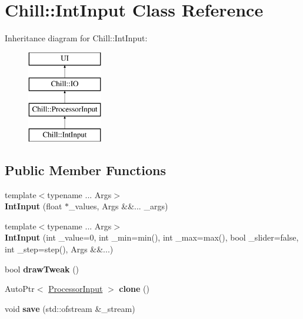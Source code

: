\hypertarget{class_chill_1_1_int_input}{}\section{Chill\+:\+:Int\+Input Class Reference}
\label{class_chill_1_1_int_input}
Inheritance diagram for Chill\+:\+:Int\+Input\+:\begin{figure}[H]
\begin{center}
\leavevmode
\includegraphics[height=4.000000cm]{class_chill_1_1_int_input}
\end{center}
\end{figure}
\subsection*{Public Member Functions}
\begin{DoxyCompactItemize}
\item 
\mbox{\label{class_chill_1_1_int_input_a1103252b1a63f9f4b0b44e92846384aa}} 
{\footnotesize template$<$typename ... Args$>$ }\\{\bfseries Int\+Input} (float $\ast$\+\_\+values, Args \&\&... \+\_\+args)
\item 
\mbox{\label{class_chill_1_1_int_input_a773428cabf7d5948bd328d1f5da5b741}} 
{\footnotesize template$<$typename ... Args$>$ }\\{\bfseries Int\+Input} (int \+\_\+value=0, int \+\_\+min=min(), int \+\_\+max=max(), bool \+\_\+slider=false, int \+\_\+step=step(), Args \&\&...)
\item 
\mbox{\label{class_chill_1_1_int_input_a70f972bfe906bc86340b60739a788e49}} 
bool {\bfseries draw\+Tweak} ()
\item 
\mbox{\label{class_chill_1_1_int_input_a8be2de3ae3ce511d433aab4cbd228ccb}} 
Auto\+Ptr$<$ \mbox{\hyperlink{class_chill_1_1_processor_input}{Processor\+Input}} $>$ {\bfseries clone} ()
\item 
\mbox{\label{class_chill_1_1_int_input_a260a4ede837d1d025381aac5b1bc3a18}} 
void {\bfseries save} (std\+::ofstream \&\+\_\+stream)
\end{DoxyCompactItemize}
